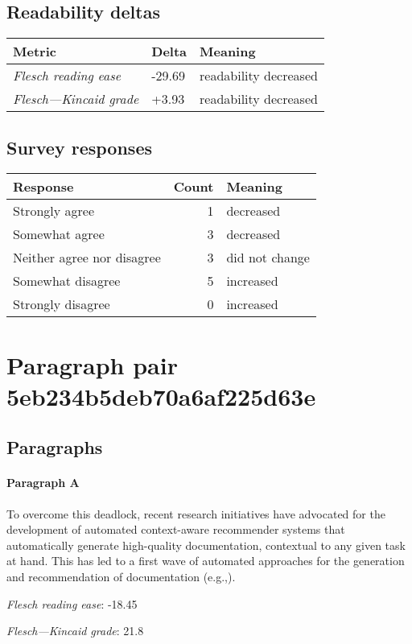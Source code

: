 \subsection{Readability deltas}

\begin{tabular}{lll}
\toprule
               \textbf{Metric} & \textbf{Delta} &       \textbf{Meaning} \\
\midrule
    \emph{Flesch reading ease} &         -29.69 &  readability decreased \\
 \emph{Flesch---Kincaid grade} &          +3.93 &  readability decreased \\
\bottomrule
\end{tabular}

\subsection{Survey responses}
\begin{tabular}{lrl}
\toprule
          \textbf{Response} &  \textbf{Count} & \textbf{Meaning} \\
\midrule
             Strongly agree &               1 &        decreased \\
             Somewhat agree &               3 &        decreased \\
 Neither agree nor disagree &               3 &   did not change \\
          Somewhat disagree &               5 &        increased \\
          Strongly disagree &               0 &        increased \\
\bottomrule
\end{tabular}

\section{Paragraph pair 5eb234b5deb70a6af225d63e}
\subsection{Paragraphs}
\paragraph{Paragraph A}
To overcome this deadlock, recent research initiatives have advocated for the development of automated context-aware recommender systems that automatically generate high-quality documentation, contextual to any given task at hand. This has led to a first wave of automated approaches for the generation and recommendation of documentation (e.g.,).\par\medskip
\emph{Flesch reading ease}: -18.45\par
\emph{Flesch---Kincaid grade}: 21.8

